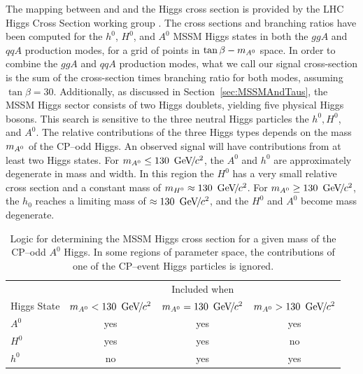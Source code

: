 The mapping between \ma and \tb and the Higgs cross section is provided by the
LHC Higgs Cross Section working group .  The cross sections and
branching ratios have been computed for the $h^0$, $H^0$, and $A^0$ MSSM Higgs
states in both the $ggA$ and $qqA$ production modes, for a grid of points in
$\mbox{\ensuremath{\tan\beta}}-m_{A^0}$ space.  In order to combine the $ggA$ and $qqA$ production modes, what
we call our signal cross-section is the sum of the cross-section times branching
ratio for both modes, assuming \mbox{$\tan\beta = 30$}.  Additionally, as
discussed in Section~\ref{sec:MSSMAndTaus}, the MSSM Higgs sector consists of
two Higgs doublets, yielding five physical Higgs bosons.  This search is
sensitive to the three neutral Higgs particles the $h^0, H^0$, and $A^0$.  The
relative contributions of the three Higgs types depends on the mass $\ma$ of the
CP--odd Higgs.  An observed signal will have contributions from at least two
Higgs states.   For $m_{A^0} \leq 130~{\,\text{Ge\hspace{-.08em}V\hspace{-0.16em}/\hspace{-0.08em}}c^\text{2}}$, the $A^0$ and $h^0$ are approximately
degenerate in mass and width.  In this region the $H^0$ has a very small
relative cross section and a constant mass of $m_{H^0} \approx 130~{\,\text{Ge\hspace{-.08em}V\hspace{-0.16em}/\hspace{-0.08em}}c^\text{2}}$.  For
$m_{A^0} \geq 130~{\,\text{Ge\hspace{-.08em}V\hspace{-0.16em}/\hspace{-0.08em}}c^\text{2}}$, the $h_0$ reaches a limiting mass of $\approx
130~{\,\text{Ge\hspace{-.08em}V\hspace{-0.16em}/\hspace{-0.08em}}c^\text{2}}$, and the $H^0$ and $A^0$ become mass degenerate.   
%
\begin{table}
  \centering
  \begin{tabular}{l|ccc} 
                & \multicolumn{3}{c}{Included when} \\
    Higgs State & $m_{A^0} < 130~{\,\text{Ge\hspace{-.08em}V\hspace{-0.16em}/\hspace{-0.08em}}c^\text{2}}$ & $m_{A^0} = 130~{\,\text{Ge\hspace{-.08em}V\hspace{-0.16em}/\hspace{-0.08em}}c^\text{2}}$ & $m_{A^0} > 130~{\,\text{Ge\hspace{-.08em}V\hspace{-0.16em}/\hspace{-0.08em}}c^\text{2}}$ \\
    \hline
    $A^0$       & yes & yes & yes \\
    $H^0$       & yes & yes & no \\
    $h^0$       & no & yes & yes \\
  \end{tabular}
  \caption[Contributions of different MSSM Higgs boson types at different
  $\ma$.]{Logic for determining the MSSM Higgs cross section for a given mass of
  the CP--odd $A^0$ Higgs.  In some regions of parameter space, the
  contributions of one of the
  CP--event Higgs particles is ignored.}
  \label{tab:HiggsXSectionCombination}
\end{table}

